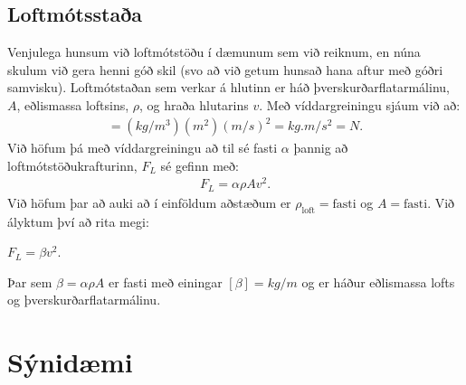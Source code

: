 \ifdefined \wholebook \else\documentclass[oneside]{book}\usepackage{EdlBook}\graphicspath{{figures/}}
\begin{document}
\subsection*{Loftmótsstaða}

Venjulega hunsum við loftmótstöðu í dæmunum sem við reiknum, en núna skulum við gera henni góð skil (svo að við getum hunsað hana aftur með góðri samvisku). Loftmótstaðan sem verkar á hlutinn er háð þverskurðarflatarmálinu, $A$, eðlismassa loftsins, $\rho$, og hraða hlutarins $v$. Með víddargreiningu sjáum við að:
\begin{align*}
    [\rho A v^2] = (\si{kg/m^3}) (\si{m^2}) (\si{m/s})^2 = \si{kg.m/s^2} = \si{N}.
\end{align*}
Við höfum þá með víddargreiningu að til sé fasti $\alpha$ þannig að loftmótstöðukrafturinn, $F_L$ sé gefinn með:
\begin{align*}
    F_L = \alpha \rho A v^2.
\end{align*}
Við höfum þar að auki að í einföldum aðstæðum er $\rho_{\text{loft}} = \text{fasti}$ og $A = \text{fasti}$. Við ályktum því að rita megi:
\begin{center}
\begin{tcbox}[nobeforeafter]{$F_L = \beta v^2.$}
\end{tcbox}
\end{center}
Þar sem $\beta = \alpha \rho A$ er fasti með einingar $[\beta] = \si{kg/m}$ og er háður eðlismassa lofts og þverskurðarflatarmálinu.

\section{Sýnidæmi}
\end{document}
